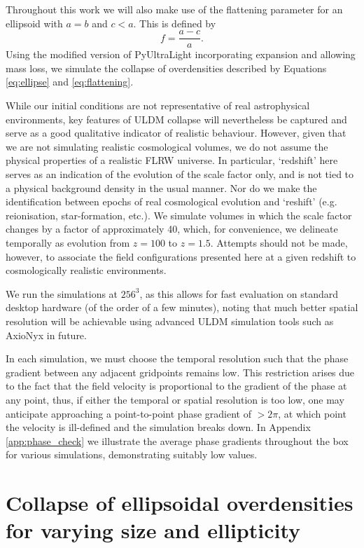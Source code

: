 \documentclass[a4paper,11pt]{article}
\begin{document}
Throughout this work we will also make use of the flattening parameter for an ellipsoid with $a = b$ and $c < a$. This is defined by
\begin{equation}\label{eq:flattening}
    f = \frac{a-c}{a}.
\end{equation}
Using the modified version of {\sc PyUltraLight} incorporating expansion and allowing mass loss, we simulate the collapse of overdensities described by Equations \ref{eq:ellipse} and \ref{eq:flattening}. 

While our initial conditions are not representative of real astrophysical environments, key features of ULDM collapse will nevertheless be captured and serve as a good qualitative indicator of realistic behaviour. However, given that we are not simulating realistic cosmological volumes, we do not assume the physical properties of a realistic FLRW universe. In particular, `redshift' here serves as an indication of the evolution of the scale factor only, and is not tied to a physical background density in the usual manner. Nor do we make the identification between epochs of real cosmological evolution and `reshift' (e.g. reionisation, star-formation, etc.). We simulate volumes in which the scale factor changes by a factor of approximately 40, which, for convenience, we delineate temporally as evolution from $z=100$ to $z=1.5$. Attempts should not be made, however, to associate the field configurations presented here at a given redshift to cosmologically realistic environments.

We run the simulations at $256^3$, as this allows for fast evaluation on standard desktop hardware (of the order of a few minutes), noting that much better spatial resolution will be achievable using advanced ULDM simulation tools such as {\sc AxioNyx} in future. 

In each simulation, we must choose the temporal resolution such that the phase gradient between any adjacent gridpoints remains low. This restriction arises due to the fact that the field velocity is proportional to the gradient of the phase at any point, thus, if either the temporal or spatial resolution is too low, one may anticipate approaching a point-to-point phase gradient of $>2\pi$, at which point the velocity is ill-defined and the simulation breaks down. In Appendix \ref{app:phase_check} we illustrate the average phase gradients throughout the box for various simulations, demonstrating suitably low values.


\section{Collapse of ellipsoidal overdensities for varying size and ellipticity}\label{sec:ellipticity}
\end{document}
